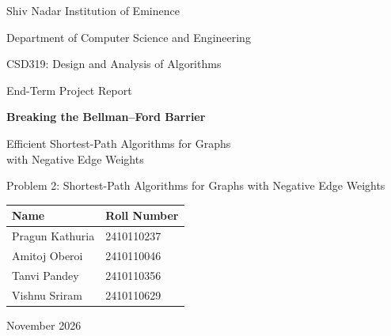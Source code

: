 \documentclass[11pt,a4paper]{article}
\theoremstyle{definition}
\begin{document}
\begin{titlepage}
\centering
{\large Shiv Nadar Institution of Eminence\par}
{\large Department of Computer Science and Engineering\par}
\vspace{0.6cm}
{\Large CSD319: Design and Analysis of Algorithms\par}
{\large End-Term Project Report\par}
\vspace{2.2cm}
{\huge\bfseries Breaking the Bellman--Ford Barrier\par}
\vspace{0.4cm}
{\Large Efficient Shortest-Path Algorithms for Graphs\\ with Negative Edge Weights\par}
\vspace{0.6cm}
{\large Problem 2: Shortest-Path Algorithms for Graphs with Negative Edge Weights\par}
\vspace{2.2cm}
\begin{tabular}{ll}
\toprule
\textbf{Name} & \textbf{Roll Number}\\
\midrule
Pragun Kathuria & 2410110237\\
Amitoj Oberoi & 2410110046\\
Tanvi Pandey & 2410110356\\
Vishnu Sriram & 2410110629\\
\bottomrule
\end{tabular}
\vfill
{\large November 2026\par}
\end{titlepage}
\end{document}
